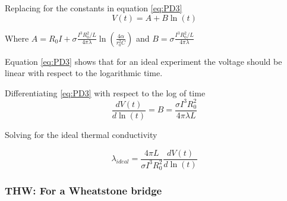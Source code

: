 \documentclass{article}
\begin{document}
Replacing for the constants in equation \ref{eq:PD3}
	\begin{equation} \label{eq:PD3}
V(t) = A + B \ln \left( t \right)
	\end{equation}

Where $ A =  R_0 I + \sigma \frac{I^3R_0^2/L}{4 \pi \lambda} \ln \left( \frac{4 \alpha } {r^2_0 C}\right) $ and $ B = \sigma \frac{I^3R_0^2/L}{4 \pi \lambda}$

Equation \ref{eq:PD3} shows that for an ideal experiment the voltage should be linear with respect to the logarithmic time.

Differentiating \ref{eq:PD3} with respect to the log of time
$$\frac{dV(t)}{d \ln (t)} = B = \frac{\sigma I^3R_0^2}{4 \pi \lambda L}$$

Solving for the ideal thermal conductivity

$$ \lambda_{ideal}= \frac{4 \pi L}{\sigma I^3R_0^2} \frac{dV(t)}{d \ln (t)} $$

\subsubsection{THW: For a Wheatstone bridge }
\end{document}
